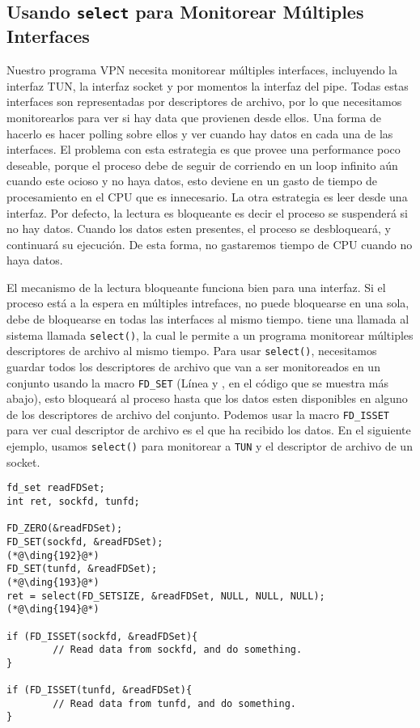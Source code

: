 \subsection{Usando \texttt{select} para Monitorear Múltiples Interfaces}
\label{vpn:subsec:select}

Nuestro programa VPN necesita monitorear múltiples interfaces, incluyendo la interfaz TUN, la interfaz socket y por momentos la interfaz del pipe.
Todas estas interfaces son representadas por descriptores de archivo, por lo que necesitamos monitorearlos para ver si hay data que provienen desde ellos.
Una forma de hacerlo es hacer polling sobre ellos y ver cuando hay datos en cada una de las interfaces. El problema con esta estrategia es que provee una performance poco deseable, porque el proceso debe de seguir de corriendo en un loop infinito aún cuando este ocioso y no haya datos, esto deviene en un gasto de tiempo de procesamiento en el CPU que es innecesario. La otra estrategia es leer desde una interfaz. Por defecto, la lectura es bloqueante es decir el proceso se suspenderá si no hay datos. Cuando los datos esten presentes, el proceso se desbloqueará, y continuará su ejecución. De esta forma, no gastaremos tiempo de CPU cuando no haya datos.

El mecanismo de la lectura bloqueante funciona bien para una interfaz. Si el proceso está a la espera en múltiples intrefaces, no puede bloquearse en una sola, debe de bloquearse en todas las interfaces al mismo tiempo. \linux tiene una llamada al sistema llamada \texttt{select()}, la cual le permite a un programa monitorear múltiples descriptores de archivo al mismo tiempo.
Para usar \texttt{select()}, necesitamos guardar todos los descriptores de archivo que van a ser monitoreados en un conjunto usando la macro \texttt{FD\_SET} (Línea  y , en el código que se muestra más abajo), esto bloqueará al proceso hasta que los datos esten disponibles en alguno de los descriptores de archivo del conjunto. Podemos usar la macro \texttt{FD\_ISSET} para ver cual descriptor de archivo es el que ha recibido los datos. En el siguiente ejemplo, usamos \texttt{select()} para monitorear a \texttt{TUN} y el descriptor de archivo de un socket.

\begin{lstlisting}
fd_set readFDSet;
int ret, sockfd, tunfd;

FD_ZERO(&readFDSet);
FD_SET(sockfd, &readFDSet);                                (*@\ding{192}@*)
FD_SET(tunfd, &readFDSet);                                 (*@\ding{193}@*)
ret = select(FD_SETSIZE, &readFDSet, NULL, NULL, NULL);    (*@\ding{194}@*)

if (FD_ISSET(sockfd, &readFDSet){
        // Read data from sockfd, and do something.
}

if (FD_ISSET(tunfd, &readFDSet){
        // Read data from tunfd, and do something. 
}
\end{lstlisting}




